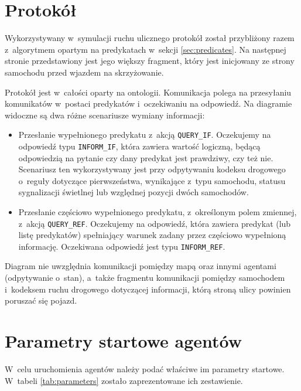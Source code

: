 \documentclass[a4paper,11pt]{article}
\begin{document}
\section{Protokół}

Wykorzystywany w~symulacji ruchu ulicznego protokół został przybliżony razem z~algorytmem opartym na predykatach w~sekcji \ref{sec:predicates}. Na następnej stronie przedstawiony jest jego większy fragment, który jest inicjowany ze strony samochodu przed wjazdem na skrzyżowanie.

Protokół jest w~całości oparty na ontologii. Komunikacja polega na przesyłaniu komunikatów w~postaci predykatów i~oczekiwaniu na odpowiedź. Na diagramie widoczne są dwa różne scenariusze wymiany informacji:

\begin{itemize}
    \item Przesłanie wypełnionego predykatu z~akcją \verb+QUERY_IF+. Oczekujemy na odpowiedź typu \verb+INFORM_IF+, która zawiera wartość logiczną, będącą odpowiedzią na pytanie czy dany predykat jest prawdziwy, czy też nie. Scenariusz ten wykorzystywany jest przy odpytywaniu kodeksu drogowego o~reguły dotyczące pierwszeństwa, wynikające z~typu samochodu, statusu sygnalizacji świetlnej lub względnej pozycji dwóch samochodów.
    \item Przesłanie częściowo wypełnionego predykatu, z~określonym polem zmiennej, z~akcją \verb+QUERY_REF+. Oczekujemy na odpowiedź, która zawiera predykat (lub listę predykatów) spełniający warunek zadany przez częściowo wypełnioną informację. Oczekiwana odpowiedź jest typu \verb+INFORM_REF+.
\end{itemize}

Diagram nie uwzględnia komunikacji pomiędzy mapą oraz innymi agentami (odpytywanie o~stan), a~także fragmentu komunikacji pomiędzy samochodem i~kodeksem ruchu drogowego dotyczącej informacji, którą stroną ulicy powinien poruszać się pojazd.



\section{Parametry startowe agentów}

W~celu uruchomienia agentów należy podać właściwe im parametry startowe. W~tabeli \ref{tab:parameters} zostało zaprezentowane ich zestawienie.
\end{document}
